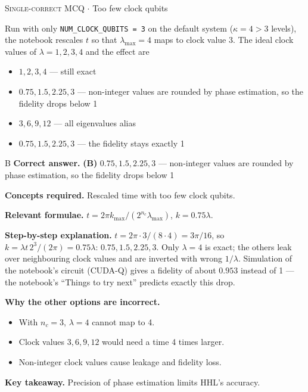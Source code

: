 \documentclass[11pt,a4paper]{article}
\newcommand{\optlabel}[1]{\textbf{(#1)}}
\newcommand{\correctlabel}[1]{\textcolor{okgreen}{\textbf{(#1)}\,\ding{51}}}
\newenvironment{qitem}[1]{\begin{list}{}{\setlength{\leftmargin}{3.3em}\setlength{\labelwidth}{3.1em}%
  \setlength{\labelsep}{0.2em}\setlength{\topsep}{3pt}\setlength{\parsep}{3pt}}\item[\textbf{Q.#1}\hfill]}{\end{list}}
\newcommand{\qsep}{\par\vspace{2pt}{\color{black!15}\hrule}\vspace{4pt}}
\newcommand{\qmeta}[2]{{\footnotesize\color{black!60}\textsc{#1} \;$\cdot$\; #2}\par}
\begin{document}
\begin{qitem}{75}
\qmeta{Single-correct MCQ}{Too few clock qubits}
Run with only \texttt{NUM\_CLOCK\_QUBITS = 3} on the default system ($\kappa = 4 > 3$ levels), the notebook rescales $t$ so that $\lambda_{\max} = 4$ maps to clock value 3. The ideal
clock values of $\lambda = 1, 2, 3, 4$ and the effect are
\begin{itemize}[leftmargin=2.6em, labelsep=0.4em, itemsep=2pt, topsep=3pt]
\item[\optlabel{A}] $1, 2, 3, 4$ --- still exact
\item[\correctlabel{B}] $0.75, 1.5, 2.25, 3$ --- non-integer values are rounded by phase estimation, so the fidelity drops below 1
\item[\optlabel{C}] $3, 6, 9, 12$ --- all eigenvalues alias
\item[\optlabel{D}] $0.75, 1.5, 2.25, 3$ --- the fidelity stays exactly 1
\end{itemize}
\end{qitem}
\begin{solbox}{B}
\textbf{\color{brand}Correct answer.} \textcolor{okgreen}{\textbf{(B)}} $0.75, 1.5, 2.25, 3$ --- non-integer values are rounded by phase estimation, so the fidelity drops below 1

\textbf{\color{brand}Concepts required.} Rescaled time with too few clock qubits.

\textbf{\color{brand}Relevant formulae.} $t = 2\pi k_{\max}/(2^{n_c}\lambda_{\max})$, $k = 0.75\lambda$.

\textbf{\color{brand}Step-by-step explanation.} $t = 2\pi\cdot3/(8\cdot4) = 3\pi/16$, so $k = \lambda t\,2^3/(2\pi) = 0.75\lambda$: $0.75, 1.5, 2.25, 3$. Only $\lambda = 4$ is exact; the others leak over neighbouring clock values and are inverted
with wrong $1/\lambda$. Simulation of the notebook's circuit (CUDA-Q) gives a fidelity of about $0.953$ instead of 1 --- the notebook's ``Things to try next'' predicts exactly this drop.

\textbf{\color{brand}Why the other options are incorrect.}
\begin{itemize}[leftmargin=2.4em, itemsep=1pt, topsep=2pt]
\item[\textbf{(A)}] With $n_c = 3$, $\lambda = 4$ cannot map to 4.
\item[\textbf{(C)}] Clock values $3, 6, 9, 12$ would need a time 4 times larger.
\item[\textbf{(D)}] Non-integer clock values cause leakage and fidelity loss.
\end{itemize}
\textbf{\color{brand}Key takeaway.} Precision of phase estimation limits HHL's accuracy.
\end{solbox}
\qsep
\end{document}
